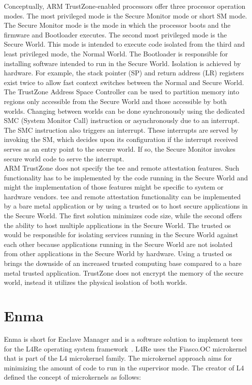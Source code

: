 Conceptually, ARM TrustZone-enabled processors offer three processor operation
modes. The most privileged mode is the Secure Monitor mode or short SM mode. The
Secure Monitor mode is the mode in which the processor boots and the firmware
and Bootloader executes. The second most privileged mode is the Secure World.
This mode is intended to execute code isolated from the third and least
privileged mode, the Normal World. The Bootloader is responsible for installing
software intended to run in the Secure World. Isolation is achieved by hardware.
For example, the stack pointer (SP) and return address (LR) registers exist
twice to allow fast context switches between the Normal and Secure World. The
TrustZone Address Space Controller can be used to partition memory into regions
only accessible from the Secure World and those accessible by both worlds.
Changing between worlds can be done synchronously using the dedicated SMC
(System Monitor Call) instruction or asynchronously due to an interrupt. The SMC
instruction also triggers an interrupt. These interrupts are served by invoking
the SM, which decides upon its configuration if the interrupt received serves as
an entry point to the secure world. If so, the Secure Monitor invokes secure
world code to serve the interrupt.\\

ARM TrustZone does not specify the \gls{tee} and remote attestation features.
Such functionality has to be implemented by the code running in the Secure World
and might the implementation of those features might be specific to system or
hardware vendors. \gls{tee} and remote attestation functionality can be
implemented by a bare metal application or by using a trusted \gls{os} to host
secure applications in the Secure World. The first solution minimizes code size,
while the second offers the ability to host multiple applications in the Secure
World. The trusted \gls{os} would be responsible for isolating services running
in the Secure World against each other because applications running in the
Secure World are not isolated from other applications in the Secure World by
hardware. Using a trusted \gls{os} brings the downside of an increased trusted
computing base compared to a bare metal trusted application. TrustZone does not
encrypt the memory of the secure world, instead it utilizes the physical
isolation of both worlds.\\

\section{Enma}
\label{sec:20:enma}
Enma is short for Enclave Manager and is a software solution to implement
\glspl{tee} for the L4Re operating system
framework~\cite{reitz_isolierende_2019}. L4Re uses the Fiasco.OC microkernel
that is part of the L4 microkernel family. The microkernel approach aims for
minimizing the amount of code to run in the supervisor mode. The creator of L4
defined the concept of microkernels as follows:

